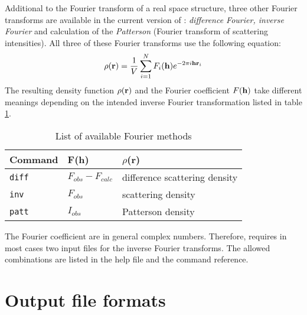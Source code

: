 Additional to the Fourier transform of a real space structure,
three other Fourier transforms are available in the current
version of {\Discus}: {\it difference Fourier, inverse Fourier}
and calculation of the {\it Patterson} (Fourier transform of
scattering intensities). All three of these Fourier transforms use
the following equation:
%
\begin{equation}
  \rho ({\bf r}) = \frac {1}{V} \sum_{i=1}^{N} F_{i} ({\bf h})
                   e ^{-2 \pi i {\bf hr}_{i}}
  \label{four-eq-inv}
\end{equation}
%
The resulting density function $\rho ({\bf r})$ and the Fourier
coefficient $F ({\bf h})$ take different meanings depending on the
intended inverse Fourier transformation listed in table
\ref{inv-tab}.
%
\begin{table}[!tbh]
\centering
\begin{tabularx}{\textwidth}{|p{22mm}|p{35mm}|X|}
  \hline
  {\bf Command} & {\bf F(h)} & {\bf $\rho$(r)} \\
  \hline\hline
  {\tt diff} & $F_{obs} - F_{calc}$ & difference scattering density \\
  {\tt inv}  & $F_{obs}$ & scattering density \\
  {\tt patt} & $I_{obs}$ & Patterson density \\
  \hline
\end{tabularx}
\caption{\label{inv-tab}List of available Fourier methods}
\end{table}
%
The Fourier coefficient are in general complex numbers.
Therefore, {\Discus} requires in most cases two input files for
the inverse Fourier transforms.  The allowed combinations are
listed in the help file and the command reference.


\section{Output file formats \label{four-out}}

